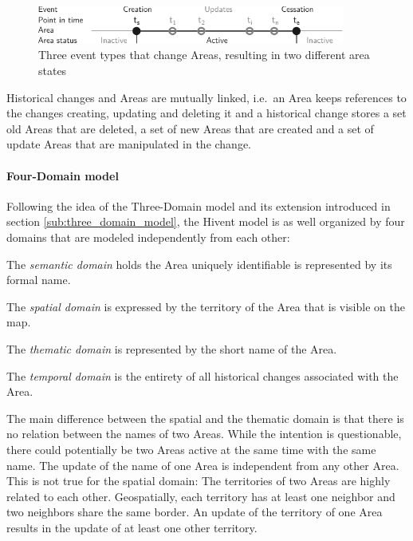 \begin{figure}[H]
  \vspace{1em}
  \centering
  \includegraphics[width=0.9\textwidth]{graphics/development/hivent_model/area_states}
  \caption{Three event types that change Areas, resulting in two different area states}
  \label{fig:area_states}
\end{figure}

Historical changes and Areas are mutually linked, i.e.\ an Area keeps references to the changes creating, updating and deleting it and a historical change stores a set old Areas that are deleted, a set of new Areas that are created and a set of update Areas that are manipulated in the change.


\paragraph{Four-Domain model} %
\label{par:four_domain_model}

Following the idea of the Three-Domain model and its extension introduced in section \ref{sub:three_domain_model}, the Hivent model is as well organized by four domains that are modeled independently from each other:

\begin{compactitem}
  \item The \emph{semantic domain} holds the Area uniquely identifiable is represented by its formal name.
  \item The \emph{spatial domain} is expressed by the territory of the Area that is visible on the map.
  \item The \emph{thematic domain} is represented by the short name of the Area.
  \item The \emph{temporal domain} is the entirety of all historical changes associated with the Area.
\end{compactitem}

The main difference between the spatial and the thematic domain is that there is no relation between the names of two Areas. While the intention is questionable, there could potentially be two Areas active at the same time with the same name. The update of the name of one Area is independent from any other Area. This is not true for the spatial domain: The territories of two Areas are highly related to each other. Geospatially, each territory has at least one neighbor and two neighbors share the same border. An update of the territory of one Area results in the update of at least one other territory.

